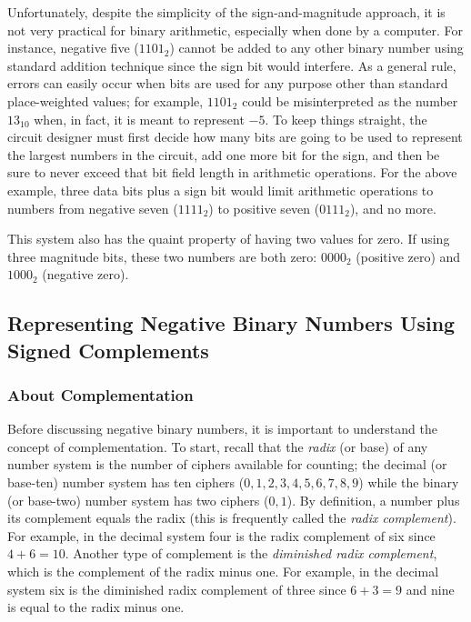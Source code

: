 Unfortunately, despite the simplicity of the sign-and-magnitude approach, it is not very practical for binary arithmetic, especially when done by a computer. For instance, negative five ($ 1101_2 $) cannot be added to any other binary number using standard addition technique since the sign bit would interfere. As a general rule, errors can easily occur when bits are used for any purpose other than standard place-weighted values; for example, $ 1101_2 $ could be misinterpreted as the number $ 13_{10} $ when, in fact, it is meant to represent $ -5 $. To keep things straight, the circuit designer must first decide how many bits are going to be used to represent the largest numbers in the circuit, add one more bit for the sign, and then be sure to never exceed that bit field length in arithmetic operations. For the above example, three data bits plus a sign bit would limit arithmetic operations to numbers from negative seven ($ 1111_2 $) to positive seven ($ 0111_2 $), and no more. 

This system also has the quaint property of having two values for zero. If using three magnitude bits, these two numbers are both zero: $ 0000_2 $ (positive zero) and $ 1000_2 $ (negative zero). 

\subsection{Representing Negative Binary Numbers Using Signed Complements }
\label{MO:sub:representing_negative_sign_complement}

\subsubsection{About Complementation}
\label{MO:subsub:about_complementation}

Before discussing negative binary numbers, it is important to understand the concept of complementation. To start, recall that the \emph{radix} (or base) of any number system is the number of ciphers available for counting; the decimal (or base-ten) number system has ten ciphers ($ 0, 1, 2, 3, 4, 5, 6, 7, 8, 9 $) while the binary (or base-two) number system has two ciphers ($ 0, 1 $). By definition, a number plus its complement equals the radix (this is frequently called the \emph{radix complement}). For example, in the decimal system four is the radix complement of six since $ 4 + 6 = 10 $. Another type of complement is the \emph{diminished radix complement}, which is the complement of the radix minus one. For example, in the decimal system six is the diminished radix complement of three since $ 6 + 3 = 9 $ and nine is equal to the radix minus one.

